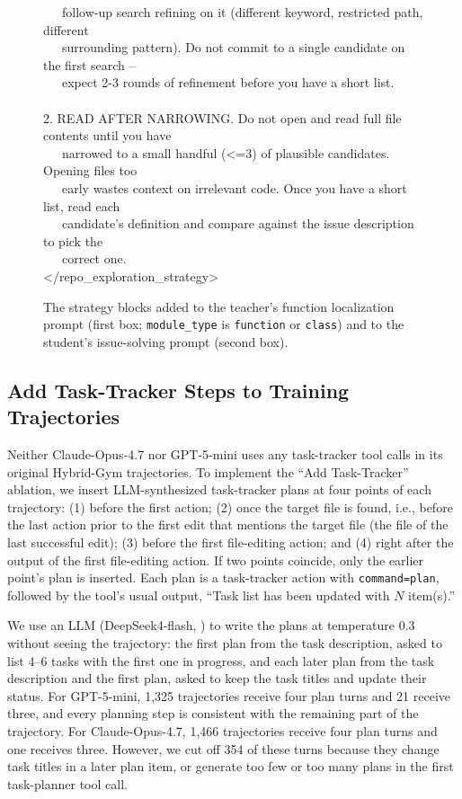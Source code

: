 \begin{figure}[!t]
\begin{tcolorbox}[colback=gray!5!white,colframe=gray!75!black,title=Strategy Block for the Student,fontupper=\small\ttfamily]
~~~follow-up search refining on it (different keyword, restricted path, different\\
~~~surrounding pattern). Do not commit to a single candidate on the first search --\\
~~~expect 2-3 rounds of refinement before you have a short list.\\
\\
2. READ AFTER NARROWING. Do not open and read full file contents until you have\\
~~~narrowed to a small handful (<=3) of plausible candidates. Opening files too\\
~~~early wastes context on irrelevant code. Once you have a short list, read each\\
~~~candidate's definition and compare against the issue description to pick the\\
~~~correct one.\\
</repo\_exploration\_strategy>
\end{tcolorbox}
\caption{The strategy blocks added to the teacher's function localization prompt (first box; \texttt{module\_type} is \texttt{function} or \texttt{class}) and to the student's issue-solving prompt (second box).}
\label{catradar:fig:prompt-strategy}
\end{figure}




\subsection{Add Task-Tracker Steps to Training Trajectories}
Neither Claude-Opus-4.7 nor GPT-5-mini uses any task-tracker tool calls in its original Hybrid-Gym trajectories.
To implement the ``Add Task-Tracker'' ablation,
we insert LLM-synthesized task-tracker plans at four points of each trajectory:
(1) before the first action;
(2) once the target file is found, i.e., before the last action prior to the first edit that mentions the target file (the file of the last successful edit);
(3) before the first file-editing action; and
(4) right after the output of the first file-editing action.
If two points coincide, only the earlier point's plan is inserted.
Each plan is a task-tracker action with \texttt{command=plan}, followed by the tool's usual output, ``Task list has been updated with $N$ item(s).''

We use an LLM (DeepSeek4-flash, \citet{deepseekv4}) to write the plans at temperature 0.3 without seeing the trajectory: the first plan from the task description, asked to list 4--6 tasks with the first one in progress, and each later plan from the task description and the first plan, asked to keep the task titles and update their status.
For GPT-5-mini, 1,325 trajectories receive four plan turns and 21 receive three, and every planning step is consistent with the remaining part of the trajectory.
For Claude-Opus-4.7, 1,466 trajectories receive four plan turns and one receives three.
However, we cut off 354 of these turns because they change task titles in a later plan item, or generate too few or too many plans in the first task-planner tool call.


